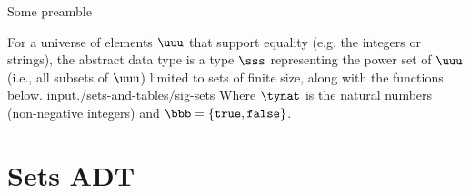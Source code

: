 Some preamble \somecommand
\begin{cluster}
\begin{datatype}[Sets]
\label{XXadt:sets} 
For a universe of elements $\uuu$ that support equality (e.g. the integers or strings), the 
 abstract data type is a type $\sss$ representing the power 
set of $\uuu$ (i.e., all subsets of $\uuu$) limited to sets of finite 
size, along with the functions below. 
{\normalsize
input{./sets-and-tables/sig-sets}
}
Where $\tynat$ is 
the natural numbers (non-negative integers) and $\bbb = \{\texttt{true},
\texttt{false}\}$.
\end{datatype}

\end{cluster}


\section{Sets ADT}

